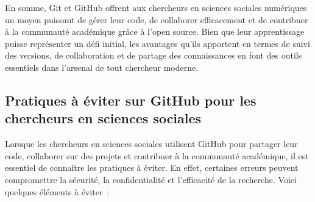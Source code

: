 \documentclass[
  letterpaper,
]{scrbook}
\begin{document}
En somme, Git et GitHub offrent aux chercheurs en sciences sociales
numériques un moyen puissant de gérer leur code, de collaborer
efficacement et de contribuer à la communauté académique grâce à l'open
source. Bien que leur apprentissage puisse représenter un défi initial,
les avantages qu'ils apportent en termes de suivi des versions, de
collaboration et de partage des connaissances en font des outils
essentiels dans l'arsenal de tout chercheur moderne.

\hypertarget{pratiques-uxe0-uxe9viter-sur-github-pour-les-chercheurs-en-sciences-sociales}{%
\subsection{Pratiques à éviter sur GitHub pour les chercheurs en
sciences
sociales}\label{pratiques-uxe0-uxe9viter-sur-github-pour-les-chercheurs-en-sciences-sociales}}

Lorsque les chercheurs en sciences sociales utilisent GitHub pour
partager leur code, collaborer sur des projets et contribuer à la
communauté académique, il est essentiel de connaître les pratiques à
éviter. En effet, certaines erreurs peuvent compromettre la sécurité, la
confidentialité et l'efficacité de la recherche. Voici quelques éléments
à éviter~:
\end{document}
